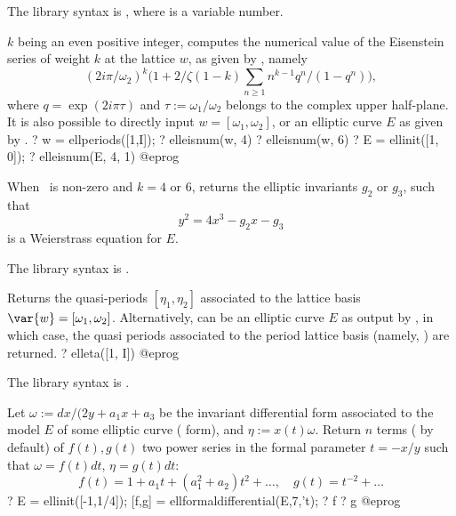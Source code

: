 The library syntax is , where  is a variable number.

\label{se:elleisnum}
$k$ being an even positive integer, computes the numerical value of the
Eisenstein series of weight $k$ at the lattice $w$, as given by
, namely
$$
(2i \pi/\omega_2)^k
\Big(1 + 2/\zeta(1-k) \sum_{n\geq 1} n^{k-1}q^n / (1-q^n)\Big),
$$
where $q = \exp(2i\pi \tau)$ and $\tau:=\omega_1/\omega_2$ belongs to the
complex upper half-plane. It is also possible to directly input $w =
[\omega_1,\omega_2]$, or an elliptic curve $E$ as given by .
\bprog
? w = ellperiods([1,I]);
? elleisnum(w, 4)
? elleisnum(w, 6)
? E = ellinit([1, 0]);
? elleisnum(E, 4, 1)
@eprog

When \fl\ is non-zero and $k=4$ or 6, returns the elliptic invariants $g_2$
or $g_3$, such that
$$y^2 = 4x^3 - g_2 x - g_3$$
is a Weierstrass equation for $E$.

The library syntax is .

\label{se:elleta}
Returns the quasi-periods $[\eta_1,\eta_2]$
associated to the lattice basis $\var{w} = [\omega_1, \omega_2]$.
Alternatively,  can be an elliptic curve $E$ as output by
, in which case, the quasi periods associated to the period
lattice basis  (namely, ) are returned.
\bprog
? elleta([1, I])
@eprog

The library syntax is .

\label{se:ellformaldifferential}
Let $\omega := dx / (2y+a_1x+a_3$ be the invariant differential form
associated to the model $E$ of some elliptic curve ( form),
and $\eta := x(t)\omega$. Return $n$ terms ( by default)
of $f(t),g(t)$ two power series in the formal parameter $t=-x/y$ such that
$\omega = f(t) dt$, $\eta = g(t) dt$:
 $$f(t) = 1+a_1 t + (a_1^2 + a_2) t^2 + \dots,\quad
   g(t) = t^{-2} +\dots $$
 \bprog
 ? E = ellinit([-1,1/4]); [f,g] = ellformaldifferential(E,7,'t);
 ? f
 ? g
@eprog

